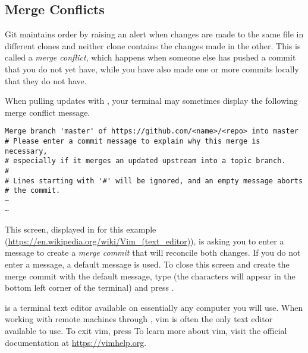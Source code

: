 \subsection*{Merge Conflicts} %
Git maintains order by raising an alert when changes are made to the same file in different clones and neither clone contains the changes made in the other.
This is called a \emph{merge conflict}, which happens when someone else  has pushed a commit that you do not yet have, while you have also made one or more commits locally that they do not have.

\begin{warn}
When pulling updates with , your terminal may sometimes display the following merge conflict message.
\begin{lstlisting}
Merge branch 'master' of https://github.com/<name>/<repo> into master
# Please enter a commit message to explain why this merge is necessary,
# especially if it merges an updated upstream into a topic branch.
#
# Lines starting with '#' will be ignored, and an empty message aborts
# the commit.
~
~
\end{lstlisting}

This screen, displayed in  for this example (\url{https://en.wikipedia.org/wiki/Vim_(text_editor)}), is asking you to enter a message to create a \emph{merge commit} that will reconcile both changes.
If you do not enter a message, a default message is used.
To close this screen and create the merge commit with the default message, type  (the characters will appear in the bottom left corner of the terminal) and press .

\end{warn}

\begin{info}
 is a terminal text editor available on essentially any computer you will use.
When working with remote machines through , vim is often the only text editor available to use.
To exit vim, press 
To learn more about vim, visit the official documentation at \url{https://vimhelp.org}.
\end{info}

